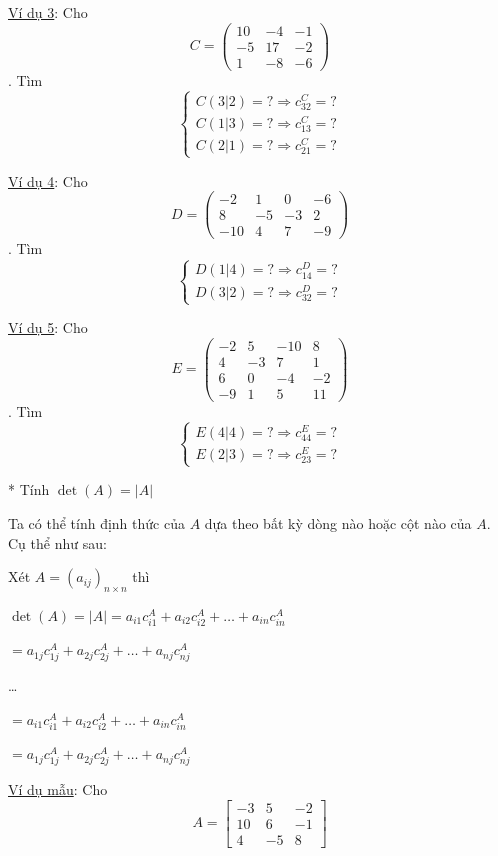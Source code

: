 \documentclass[
]{article}
\let\ul\uline
\begin{document}
\ul{Ví dụ 3}: Cho
$$C = \begin{pmatrix} 10 & -4 & -1 \\ -5 & 17 & -2 \\ 1 & -8 & -6 \end{pmatrix}$$. Tìm
$$\begin{cases} C(3|2) = ? \Rightarrow c_{32}^C = ? \\ C(1|3) = ? \Rightarrow c_{13}^C = ? \\ C(2|1) = ? \Rightarrow c_{21}^C = ? \end{cases}$$

\ul{Ví dụ 4}: Cho
$$D = \begin{pmatrix} -2 & 1 & 0 & -6 \\ 8 & -5 & -3 & 2 \\ -10 & 4 & 7 & -9 \end{pmatrix}$$. Tìm
$$\begin{cases} D(1|4) = ? \Rightarrow c_{14}^D = ? \\ D(3|2) = ? \Rightarrow c_{32}^D = ? \end{cases}$$

\ul{Ví dụ 5}: Cho
$$E = \begin{pmatrix} -2 & 5 & -10 & 8 \\ 4 & -3 & 7 & 1 \\ 6 & 0 & -4 & -2 \\ -9 & 1 & 5 & 11 \end{pmatrix}$$. Tìm
$$\begin{cases} E(4|4) = ? \Rightarrow c_{44}^E = ? \\ E(2|3) = ? \Rightarrow c_{23}^E = ? \end{cases}$$

* Tính $\det(A) = |A|$

Ta có thể tính định thức của
$A$ dựa theo bất
kỳ dòng nào hoặc cột nào của
$A$. Cụ thể như
sau:

Xét $A = (a_{ij})_{n \times n}$ thì

$\det(A) = |A| = a_{i1}c_{i1}^A + a_{i2}c_{i2}^A + \dots + a_{in}c_{in}^A$

$= a_{1j}c_{1j}^A + a_{2j}c_{2j}^A + \dots + a_{nj}c_{nj}^A$

\ldots{}

$= a_{i1}c_{i1}^A + a_{i2}c_{i2}^A + \dots + a_{in}c_{in}^A$

$= a_{1j}c_{1j}^A + a_{2j}c_{2j}^A + \dots + a_{nj}c_{nj}^A$

\ul{Ví dụ mẫu}: Cho
$$A = \begin{bmatrix} -3 & 5 & -2 \\ 10 & 6 & -1 \\ 4 & -5 & 8 \end{bmatrix}$$
\end{document}
